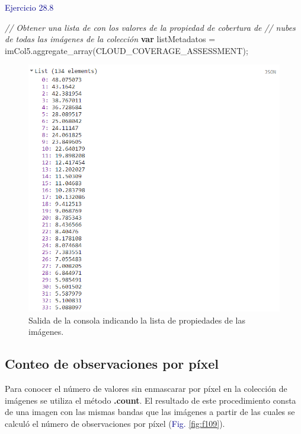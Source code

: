 \documentclass[
  12pt,
  letterpaper,
  twoside]{book}
\newenvironment{Shaded}{\begin{snugshade}}{\end{snugshade}}
\newcommand{\CommentTok}[1]{\textcolor[rgb]{0.24,0.58,0.00}{\textit{#1}}}
\newcommand{\FunctionTok}[1]{\textcolor[rgb]{0.48,0.12,0.64}{#1}}
\newcommand{\KeywordTok}[1]{\textcolor[rgb]{0.00,0.00,0.00}{\textbf{#1}}}
\newcommand{\NormalTok}[1]{#1}
\newcommand{\OperatorTok}[1]{\textcolor[rgb]{0.00,0.00,0.00}{#1}}
\newcommand{\StringTok}[1]{\textcolor[rgb]{0.87,0.29,0.22}{#1}}
\newcommand\boldpurple[1]{\textcolor{darkpurple}{\textbf{#1}}}
\begin{document}
\textcolor{darkblue}{Ejercicio 28.8}

\begin{Shaded}
\begin{Highlighting}[]
\CommentTok{// Obtener una lista de con los valores de la propiedad de cobertura de }
\CommentTok{// nubes de todas las imágenes de la colección}
\KeywordTok{var}\NormalTok{ listMetadatos }\OperatorTok{=}\NormalTok{ imCol5}\OperatorTok{.}\FunctionTok{aggregate\_array}\NormalTok{(}\StringTok{\textquotesingle{}CLOUD\_COVERAGE\_ASSESSMENT\textquotesingle{}}\NormalTok{)}\OperatorTok{;}
\end{Highlighting}
\end{Shaded}

\begin{figure}[H]

{\centering \includegraphics[width=0.8\linewidth]{Img/cloudCoverList} 

}

\caption{Salida de la consola indicando la lista de propiedades de las imágenes.}\label{fig:f108}
\end{figure}

\hypertarget{conteo-de-observaciones-por-puxedxel}{%
\subsection*{Conteo de observaciones por píxel}\label{conteo-de-observaciones-por-puxedxel}}

Para conocer el número de valores sin enmascarar por píxel en la colección de imágenes se utiliza el método \boldpurple{.count}. El resultado de este procedimiento consta de una imagen con las mismas bandas que las imágenes a partir de las cuales se calculó el número de observaciones por píxel (\textcolor{darkblue}{Fig.} \ref{fig:f109}).
\end{document}
